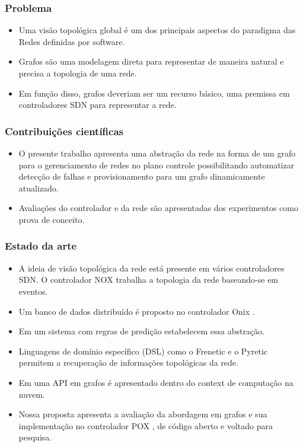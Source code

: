 %
%
\begin{frame}\frametitle{Problema}
    \begin{itemize}
        \setlength{\itemsep}{1cm}
        \item Uma visão topológica global é um dos principais aspectos do 
              paradigma das Redes definidas por software.
        \item Grafos são uma modelagem direta para representar de maneira 
              natural e precisa a topologia de uma rede.
        \item Em função disso, grafos deveriam ser um recurso básico, 
              uma premissa em controladores SDN para representar a rede.
    \end{itemize} 
\end{frame}


%
%
\begin{frame}\frametitle{Contribuições científicas}
    \begin{itemize}
        \setlength{\itemsep}{1cm}
        \item O presente trabalho apresenta uma abstração da rede na forma 
              de um grafo para o gerenciamento de redes no plano controle 
              possibilitando automatizar detecção de falhas e 
              provisionamento para um grafo dinamicamente atualizado.
        \item Avaliações do controlador e da rede são apresentadas dos
              experimentos como prova de conceito.

    \end{itemize}
\end{frame}


%
%
\begin{frame}\frametitle{Estado da arte}
    \begin{itemize}
        \item A ideia de visão topológica da rede está presente em vários 
            controladores SDN. O controlador NOX \citep{gude2008nox} 
            trabalha a topologia da rede baseando-se em eventos.
        \item Um banco de dados distribuído é proposto no controlador Onix 
            \citep{teemu2010onix}.
        \item Em \citep{hinrichs2009pratical} um sistema com regras de predição 
            estabelecem essa abstração.
        \item Linguagens de domínio específico (DSL) como o Frenetic 
            \citep{foster2011frenetic} e o Pyretic 
            \citep{monsanto2013composing} permitem a recuperação de 
            informações topológicas da rede.
        \item Em \citep{ramya2012dynamic} uma API em grafos é apresentado 
            dentro do context de computação na nuvem.
        \item Nossa proposta apresenta a avaliação da abordagem em grafos e 
            sua implementação no controlador POX \citep{pox2015}, de código 
            aberto e voltado para pesquisa.
    \end{itemize} 
 
\end{frame}
